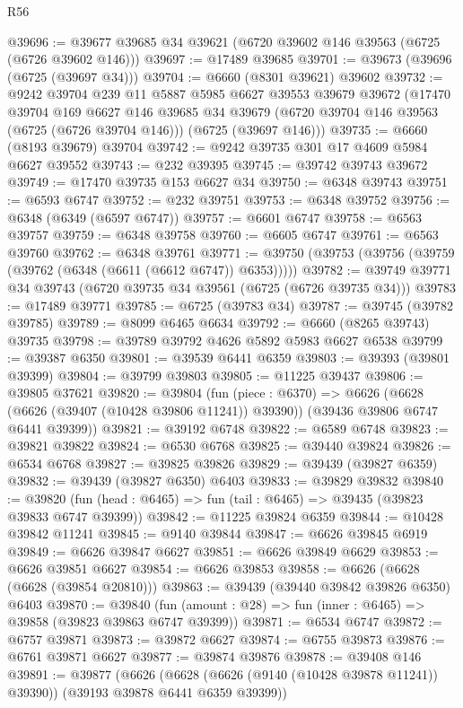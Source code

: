 \begin{lexlean}{R56}
\begin{coremodule}
@39696 := @39677 @39685 @34 @39621 (@6720 @39602 @146 @39563 (@6725 (@6726 @39602 @146)))
@39697 := @17489 @39685
@39701 := @39673 (@39696 (@6725 (@39697 @34)))
@39704 := @6660 (@8301 @39621) @39602
@39732 := @9242
    @39704
    @239
    @11
    @5887
    @5985
    @6627
    @39553
    @39679
    @39672
    (@17470
      @39704
      @169
      @6627
      @146
      @39685
      @34
      @39679
      (@6720 @39704 @146 @39563 (@6725 (@6726 @39704 @146)))
      (@6725 (@39697 @146)))
@39735 := @6660 (@8193 @39679) @39704
@39742 := @9242 @39735 @301 @17 @4609 @5984 @6627 @39552
@39743 := @232 @39395
@39745 := @39742 @39743 @39672
@39749 := @17470 @39735 @153 @6627 @34
@39750 := @6348 @39743
@39751 := @6593 @6747
@39752 := @232 @39751
@39753 := @6348 @39752
@39756 := @6348 (@6349 (@6597 @6747))
@39757 := @6601 @6747
@39758 := @6563 @39757
@39759 := @6348 @39758
@39760 := @6605 @6747
@39761 := @6563 @39760
@39762 := @6348 @39761
@39771 := @39750 (@39753 (@39756 (@39759 (@39762 (@6348 (@6611 (@6612 @6747)) @6353)))))
@39782 := @39749 @39771 @34 @39743 (@6720 @39735 @34 @39561 (@6725 (@6726 @39735 @34)))
@39783 := @17489 @39771
@39785 := @6725 (@39783 @34)
@39787 := @39745 (@39782 @39785)
@39789 := @8099 @6465 @6634
@39792 := @6660 (@8265 @39743) @39735
@39798 := @39789 @39792 @4626 @5892 @5983 @6627 @6538
@39799 := @39387 @6350
@39801 := @39539 @6441 @6359
@39803 := @39393 (@39801 @39399)
@39804 := @39799 @39803
@39805 := @11225 @39437
@39806 := @39805 @37621
@39820 := @39804
    (fun (piece : @6370) =>
    @6626 (@6628 (@6626 (@39407 (@10428 @39806 @11241)) @39390)) (@39436 @39806 @6747 @6441 @39399))
@39821 := @39192 @6748
@39822 := @6589 @6748
@39823 := @39821 @39822
@39824 := @6530 @6768
@39825 := @39440 @39824
@39826 := @6534 @6768
@39827 := @39825 @39826
@39829 := @39439 (@39827 @6359)
@39832 := @39439 (@39827 @6350) @6403
@39833 := @39829 @39832
@39840 := @39820 (fun (head : @6465) => fun (tail : @6465) => @39435 (@39823 @39833 @6747 @39399))
@39842 := @11225 @39824 @6359
@39844 := @10428 @39842 @11241
@39845 := @9140 @39844
@39847 := @6626 @39845 @6919
@39849 := @6626 @39847 @6627
@39851 := @6626 @39849 @6629
@39853 := @6626 @39851 @6627
@39854 := @6626 @39853
@39858 := @6626 (@6628 (@6628 (@39854 @20810)))
@39863 := @39439 (@39440 @39842 @39826 @6350) @6403
@39870 := @39840 (fun (amount : @28) => fun (inner : @6465) => @39858 (@39823 @39863 @6747 @39399))
@39871 := @6534 @6747
@39872 := @6757 @39871
@39873 := @39872 @6627
@39874 := @6755 @39873
@39876 := @6761 @39871 @6627
@39877 := @39874 @39876
@39878 := @39408 @146
@39891 := @39877
    (@6626 (@6628 (@6626 (@9140 (@10428 @39878 @11241)) @39390)) (@39193 @39878 @6441 @6359 @39399))

\end{coremodule}
\end{lexlean}
